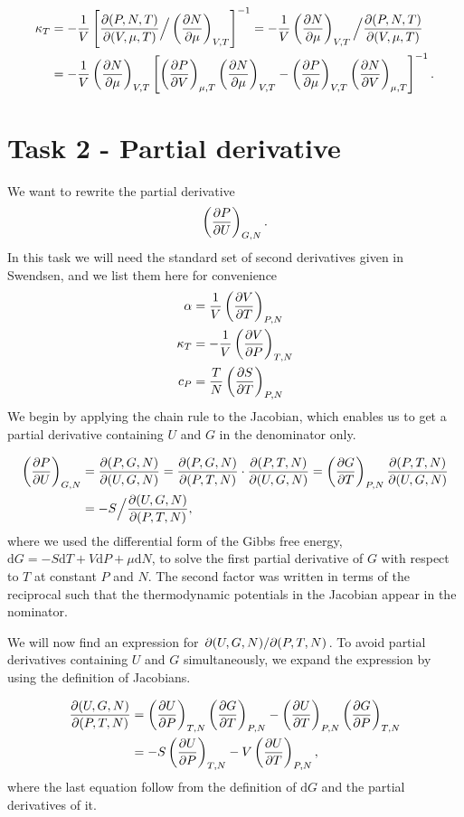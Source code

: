 \documentclass[reprint,english,notitlepage,aps,nobalancelastpage,nofootinbib]{revtex4-1}
\newcommand{\closed}[1]{\left(#1\right)}
\newcommand{\bracket}[1]{\left[#1\right]}
\newcommand{\kt}{\kappa_T}
\renewcommand{\cp}{c_P}
\renewcommand{\a}{\alpha}
\newcommand{\tmdv}[4]{\closed{\pdv{#1}{#2}}_{#3,#4}}
\newcommand{\jacobian}[2]{\pdv{(#1)}{(#2)}}
\renewcommand{\d}{\mathrm{d}}
\begin{document}
\begin{align*}
	\kt &= -\frac{1}{V}\bracket{\jacobian{P,N,T}{V,\mu,T} \Big/ \tmdv{N}{\mu}{V}{T}}^{-1}=-\frac{1}{V} \tmdv{N}{\mu}{V}{T} \Big/
	\jacobian{P,N,T}{V,\mu,T} \\
	&= -\frac{1}{V} \tmdv{N}{\mu}{V}{T} \bracket{\tmdv{P}{V}{\mu}{T}\tmdv{N}{\mu}{V}{T}-\tmdv{P}{\mu}{V}{T}\tmdv{N}{V}{\mu}{T}}^{-1}.
\end{align*}

\clearpage
\section*{\large Task 2 - Partial derivative}
We want to rewrite the partial derivative 
\begin{align*}
	\tmdv{P}{U}{G}{N}.
\end{align*}
In this task we will need the standard set of second derivatives given in Swendsen, and we list them here for convenience
\begin{align}
	\a &= \frac{1}{V} \tmdv{V}{T}{P}{N} \label{eq:alpha} \\ 
	\kt &= -\frac{1}{V} \tmdv{V}{P}{T}{N} \label{eq:kappa} \\ 
	\cp &= \frac{T}{N} \tmdv{S}{T}{P}{N} \label{eq:cp} \\ 
\end{align}
We begin by applying the chain rule to the Jacobian, which enables us to get a partial derivative containing $U$ and $G$ in the denominator only. 

\begin{align} 
	\tmdv{P}{U}{G}{N} &= \jacobian{P,G,N}{U,G,N} = \jacobian{P,G,N}{P,T,N}\cdot\jacobian{P,T,N}{U,G,N}= \tmdv{G}{T}{P}{N} \jacobian{P,T,N}{U,G,N} \nonumber \\
	&= -S \Big/\jacobian{U,G,N}{P,T,N}, \label{eq:pdv first expansion}
\end{align}
where we used the differential form of the Gibbs free energy, $\mathrm{d}G=-S\mathrm{d}T+V\mathrm{d}P+\mu\mathrm{d}N$, to solve the first partial derivative of $G$ with respect to $T$ at constant $P$ and $N$. The second factor was written in terms of the reciprocal such that the thermodynamic potentials in the Jacobian appear in the nominator. 

We will now find an expression for $\pdv*{(U,G,N)}{(P,T,N)}$. To avoid partial derivatives containing $U$ and $G$ simultaneously, we expand the expression by using the definition of Jacobians. 

\begin{align}
	\jacobian{U,G,N}{P,T,N} &= \tmdv{U}{P}{T}{N} \tmdv{G}{T}{P}{N} - \tmdv{U}{T}{P}{N}\tmdv{G}{P}{T}{N} \nonumber \\ 
	&= -S\tmdv{U}{P}{T}{N} - V \tmdv{U}{T}{P}{N}, \label{eq:d UGN_d PTN}
\end{align}
where the last equation follow from the definition of $\d G$ and the partial derivatives of it. 
\end{document}
